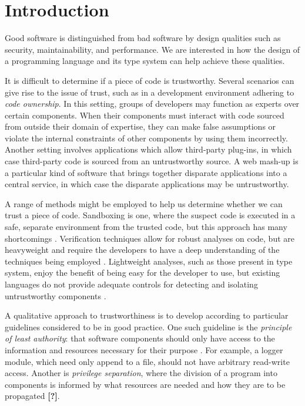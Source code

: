 \chapter{Introduction}\label{C:intro}

Good software is distinguished from bad software by design qualities such as security, maintainability, and performance. We are interested in how the design of a programming language and its type system can help achieve these qualities.

It is difficult to determine if a piece of code is trustworthy. Several scenarios can give rise to the issue of trust, such as in a development environment adhering to \textit{code ownership}. In this setting, groups of developers may function as experts over certain components. When their components must interact with code sourced from outside their domain of expertise, they can make false assumptions or violate the internal constraints of other components by using them incorrectly. Another setting involves applications which allow third-party plug-ins, in which case third-party code is sourced from an untrustworthy source. A web mash-up is a particular kind of software that brings together disparate applications into a central service, in which case the disparate applications may be untrustworthy.

A range of methods might be employed to help us determine whether we can trust a piece of code. Sandboxing is one, where the suspect code is executed in a safe, separate environment from the trusted code, but this approach has many shortcomings \cite{Jonathan's papers}. Verification techniques allow for robust analyses on code, but are heavyweight and require the developers to have a deep understanding of the techniques being employed \cite{folklore or citation?}. Lightweight analyses, such as those present in type system, enjoy the benefit of being easy for the developer to use, but existing languages do not provide adequate controls for detecting and isolating untrustworthy components \cite{see citations in Darya's modules paper}.

A qualitative approach to trustworthiness is to develop according to particular guidelines considered to be in good practice. One such guideline is the \textit{principle of least authority}: that software components should only have access to the information and resources necessary for their purpose \cite{saltzer74}. For example, a logger module, which need only append to a file, should not have arbitrary read-write access. Another is \textit{privilege separation}, where the division of a program into components is informed by what resources are needed and how they are to be propagated \textbf{[?]}.

